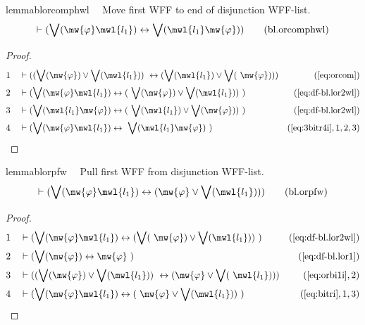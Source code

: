 \begin{restatable}{lemma}{blorcomphwl}~~ Move first WFF to end of disjunction
WFF-list.
\begin{align}
\vdash ( \bigvee( \mw{\varphi} \mwl{l_1} ) \leftrightarrow \bigvee( \mwl{l_1}
    \mw{\varphi} ) )\label{eq:bl.orcomphwl}\tag{bl.orcomphwl}
\end{align}
\end{restatable}

\begin{proof}
\begin{align}
  1 &&  & \vdash ( ( \bigvee( \mw{\varphi} ) \vee \bigvee( \mwl{l_1} ) )
     ~\leftrightarrow ( \bigvee( \mwl{l_1} ) \vee \bigvee(
     ~\mw{\varphi} ) ) )&(\mbox{\ref{eq:orcom}})\notag
  \\ 2 &&  & \vdash ( \bigvee( \mw{\varphi} \mwl{l_1} ) \leftrightarrow (
     ~\bigvee( \mw{\varphi} ) \vee \bigvee( \mwl{l_1} ) )
     ~)&(\mbox{\ref{eq:df-bl.lor2wl}})\notag
  \\ 3 &&  & \vdash ( \bigvee( \mwl{l_1} \mw{\varphi} ) \leftrightarrow (
     ~\bigvee( \mwl{l_1} ) \vee \bigvee( \mw{\varphi} ) )
     ~)&(\mbox{\ref{eq:df-bl.lor2wl}})\notag
  \\ 4 &&  & \vdash ( \bigvee( \mw{\varphi} \mwl{l_1} ) \leftrightarrow
     ~\bigvee( \mwl{l_1} \mw{\varphi} )
     ~)&(\mbox{\ref{eq:3bitr4i}},1,2,3)\notag
\end{align}
\end{proof}

\begin{restatable}{lemma}{blorpfw}~~ Pull first WFF from disjunction WFF-list.
\begin{align}
\vdash ( \bigvee( \mw{\varphi} \mwl{l_1} ) \leftrightarrow ( \mw{\varphi} \vee
    \bigvee( \mwl{l_1} ) ) )\label{eq:bl.orpfw}\tag{bl.orpfw}
\end{align}
\end{restatable}

\begin{proof}
\begin{align}
  1 &&  & \vdash ( \bigvee( \mw{\varphi} \mwl{l_1} ) \leftrightarrow ( \bigvee(
     ~\mw{\varphi} ) \vee \bigvee( \mwl{l_1} ) )
     ~)&(\mbox{\ref{eq:df-bl.lor2wl}})\notag
  \\ 2 &&  & \vdash ( \bigvee( \mw{\varphi} ) \leftrightarrow \mw{\varphi}
     ~)&(\mbox{\ref{eq:df-bl.lor1}})\notag
  \\ 3 &&  & \vdash ( ( \bigvee( \mw{\varphi} ) \vee \bigvee( \mwl{l_1} ) )
     ~\leftrightarrow ( \mw{\varphi} \vee \bigvee(
     ~\mwl{l_1} ) ) )&(\mbox{\ref{eq:orbi1i}},2)\notag
  \\ 4 &&  & \vdash ( \bigvee( \mw{\varphi} \mwl{l_1} ) \leftrightarrow (
     ~\mw{\varphi} \vee \bigvee( \mwl{l_1} ) )
     ~)&(\mbox{\ref{eq:bitri}},1,3)\notag
\end{align}
\end{proof}

